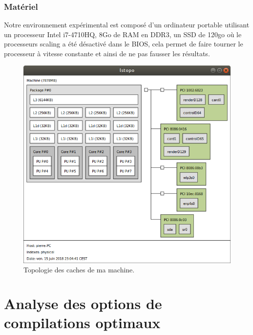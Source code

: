 \documentclass[
 aip,
 jmp,
 amsmath,amssymb,
 reprint
]{revtex4-1}
\begin{document}
\subsubsection{Matériel}
Notre environnement expérimental est composé d'un ordinateur portable utilisant un processeur Intel i7-4710HQ, 8Go de RAM en DDR3, un SSD de 120go où le processeurs scaling a été désactivé dans le BIOS, cela permet de faire tourner le processeur à vitesse constante et ainsi de ne pas fausser les résultats.

\begin{figure}[H]
  \includegraphics[width=\linewidth, keepaspectratio=true]{caches.png}
  \caption{Topologie des caches de ma machine.\label{Fig:caches}}
\end{figure}

\section{Analyse des options de compilations optimaux}
\end{document}
